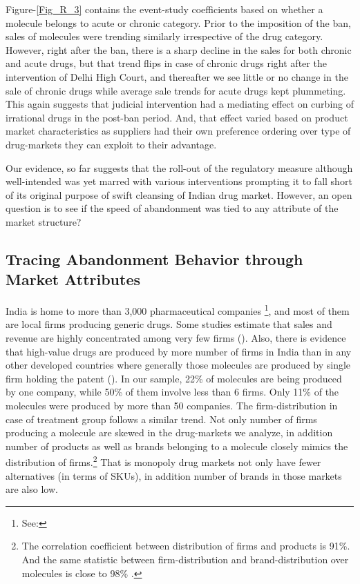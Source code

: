 \documentclass[AER]{AEA}
\theoremstyle{theorem}
\begin{document}
Figure-\ref{Fig_R_3} contains the event-study coefficients based on whether a molecule belongs to acute or chronic category. Prior to the imposition of the ban, sales of molecules were trending similarly irrespective of the drug category. However, right after the ban, there is a sharp decline in the sales for both chronic and acute drugs, but that trend flips in case of chronic drugs right after the intervention of Delhi High Court, and thereafter we see little or no change in the sale of chronic drugs while average sale trends for acute drugs kept plummeting. This again suggests that judicial intervention had a mediating effect on curbing of irrational drugs in the post-ban period. And, that effect varied based on product market characteristics as suppliers had their own preference ordering over type of drug-markets they can exploit to their advantage. 

Our evidence, so far suggests that the roll-out of the regulatory measure although well-intended  was yet marred with various interventions prompting it to fall short of its original purpose of swift cleansing of Indian drug market. However, an open question is to see if the speed of abandonment was tied to any attribute of the market structure? 

\subsection{Tracing Abandonment Behavior through Market Attributes}

India is home to more than 3,000 pharmaceutical companies \footnote{See: \FTwentytwo }, and most of them are local firms producing generic drugs. Some studies estimate that sales and revenue are highly concentrated among very few firms (\cite{chitra2020pharmaceutical}). Also, there is evidence that high-value drugs are produced by more number of firms in India than in any other developed countries where generally those molecules are produced by single firm holding the patent (\cite{duggan2016market}). In our sample, 22\% of molecules are being produced by one company, while 50\% of them involve less than 6 firms. Only 11\% of the molecules were produced by more than 50 companies. The firm-distribution in case of treatment group follows a similar trend. Not only number of firms producing a molecule are skewed in the drug-markets we analyze, in addition number of products as well as brands belonging to a molecule closely mimics the distribution of firms.\footnote{The correlation coefficient between distribution of firms and products is 91\%. And the same statistic between firm-distribution and brand-distribution over molecules is close to 98\% .} That is monopoly drug markets not only have fewer alternatives (in terms of SKUs), in addition number of brands in those markets are also low. 
\end{document}
